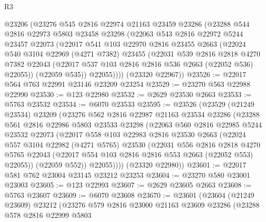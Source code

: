 \begin{lexlean}{R3}
\begin{coremodule}
      @23206
      (@23276
        @545
        @2816
        @22974
        @21163
        @23459
        @23286
        (@23288
          @544
          @2816
          @22973
          @5803
          @23458
          @23298
          (@22063
            @543
            @2816
            @22972
            @5244
            @23457
            @22073
            (@22017
              @541
              @103
              @22970
              @2816
              @23455
              @2663
              (@22024
                @540
                @3104
                @22969
                (@4271 @7382)
                @23455
                (@22031
                  @539
                  @2816
                  @2818
                  @4270
                  @7382
                  @22043
                  (@22017 @537 @103 @2816 @2816 @536 @2663 (@22052 @536) @22055))
                (@22059 @535))
              @22055))))
      (@23320 @22967))
@23526 := @22017 @564 @763 @22991 @23146 @23209 @23254
@23529 := @23270 @563 @22988 @22990
@23530 := @123 @22980
@23532 := @2629 @23530 @2663
@23533 := @5763 @23532
@23534 := @6070 @23533
@23595 := @23526
    (@23529
      (@21249 @23534)
      @23209
      (@23276
        @562
        @2816
        @22987
        @21163
        @23534
        @23286
        (@23288
          @561
          @2816
          @22986
          @5803
          @23533
          @23298
          (@22063
            @560
            @2816
            @22985
            @5244
            @23532
            @22073
            (@22017
              @558
              @103
              @22983
              @2816
              @23530
              @2663
              (@22024
                @557
                @3104
                @22982
                (@4271 @5765)
                @23530
                (@22031
                  @556
                  @2816
                  @2818
                  @4270
                  @5765
                  @22043
                  (@22017 @554 @103 @2816 @2816 @553 @2663 (@22052 @553) @22055))
                (@22059 @552))
              @22055))))
      (@23320 @22980))
@23601 := @22017 @581 @762 @23004 @23145 @23212 @23253
@23604 := @23270 @580 @23001 @23003
@23605 := @123 @22993
@23607 := @2629 @23605 @2663
@23608 := @5763 @23607
@23609 := @6070 @23608
@23670 := @23601
    (@23604
      (@21249 @23609)
      @23212
      (@23276
        @579
        @2816
        @23000
        @21163
        @23609
        @23286
        (@23288
          @578
          @2816
          @22999
          @5803

\end{coremodule}
\end{lexlean}
